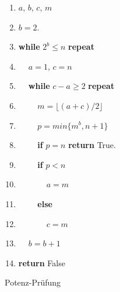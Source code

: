 \documentclass[12pt,oneside]{article}
\theoremstyle{remark}
\theoremstyle{definition}
\begin{document}
\begin{algorithm}[H]
\SetAlgoLined
{}
\begin{enumerate}
\item $a, \, b, \, c, \, m$

\item $ b = 2$.

\item \textbf{while} $2^b \leq n$ \textbf{repeat}

\item $\: \: \: \: $ $a = 1, \, c = n $

\item $\: \: \: \: $ \textbf{while} $c - a \geq 2$ \textbf{repeat}

\item $\: \: \: \: \: \: \: \: \:$ $ m = \lfloor (a + c)/2 \rfloor$

\item $\: \: \: \: \: \: \: \: \:$ $ p = min\{m^b,n+1\}$

\item $\: \: \: \: \: \: \: \: \:$ \textbf{if} $ p = n$ \textbf{return} True.

\item $\: \: \: \: \: \: \: \: \:$ \textbf{if} $p < n$

\item $\: \: \: \: \: \: \: \: \: \: \: \: \: \:$  $ a = m$

\item $\: \: \: \: \: \: \: \: \:$ \textbf{else}

\item $\: \: \: \: \: \: \: \: \: \: \: \: \: \:$  $c = m$

\item $\: \: \: \: $ $b = b + 1$

\item \textbf{return} False


\end{enumerate}
 
\caption{Potenz-Prüfung}
\end{algorithm}


\end{document}
